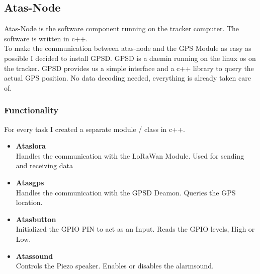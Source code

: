 \documentclass[a4paper,11pt, oneside]{report}
\theoremstyle{definition}
\begin{document}
\newpage
  
\subsection{Atas-Node}  
Atas-Node is the software component running on the tracker computer. The software is written in c++.\\[0.3cm]
To make the communication between atas-node and the GPS Module as easy as possible I decided to install GPSD. GPSD is a daemin running on the linux os on the tracker. GPSD provides us a simple interface and a c++ library to query the actual GPS position. No data decoding needed, everything is already taken care of.\

\subsubsection{Functionality}
For every task I created a separate module / class in c++.
\begin{itemize}
\item \textbf{Ataslora}\\
Handles the communication with the LoRaWan Module. Used for sending and receiving data
\item \textbf{Atasgps}\\
Handles the communication with the GPSD Deamon. Queries the GPS location.
\item \textbf{Atasbutton}\\
Initialized the GPIO PIN to act as an Input. Reads the GPIO levels, High or Low.
\item \textbf{Atassound}\\
Controls the Piezo speaker. Enables or disables the alarmsound.
\end{itemize}
\end{document}
